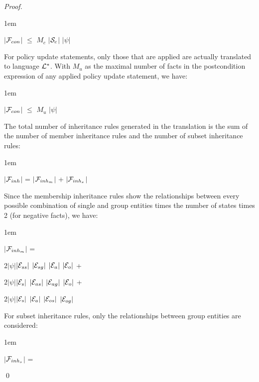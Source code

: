 \documentclass[global,twocolumn,final]{svjour}
\newenvironment{vproof}
  {\begin{proof}\hspace{0.25em}}
  {\qed\end{proof}}
\newenvironment{vquote}
  {\begin{list}{}{\leftmargin 1em}\item[]}
  {\end{list}}
\begin{document}
\begin{vproof}
          \begin{vquote}
            $|$${\cal F}_{con}$$|$ $\leq$ $M_{c}$ $|$${\cal S}_{c}$$|$ $|\psi|$
          \end{vquote}

          For policy update statements, only those that are applied are
          actually translated to language ${\cal L}^{*}$. With $M_{u}$ as the
          maximal number of facts in the postcondition expression of any
          applied policy update statement, we have:

          \begin{vquote}
            $|$${\cal F}_{con}$$|$ $\leq$ $M_{u}$ $|\psi|$
          \end{vquote}

          The total number of inheritance rules generated in the translation is
          the sum of the number of member inheritance rules and the number of
          subset inheritance rules:

          \begin{vquote}
            $|$${\cal F}_{inh}$$|$ =
            $|$${\cal F}_{inh_{m}}$$|$ +
            $|$${\cal F}_{inh_{s}}$$|$
          \end{vquote}

          Since the membership inheritance rules show the relationships between
          every possible combination of single and group entities times the
          number of states times 2 (for negative facts), we have:

          \begin{vquote}
            $|$${\cal F}_{inh_{m}}$$|$ =

            \hspace{1em}
            $2|\psi|$$|{\cal E}_{ss}|$ $|{\cal E}_{sg}|$ $|{\cal E}_{a}|$ $|{\cal E}_{o}|$ +

            \hspace{1em}
            $2|\psi|$$|{\cal E}_{s}|$ $|{\cal E}_{as}|$ $|{\cal E}_{ag}|$ $|{\cal E}_{o}|$ +

            \hspace{1em}
            $2|\psi|$$|{\cal E}_{s}|$ $|{\cal E}_{a}|$ $|{\cal E}_{os}|$ $|{\cal E}_{og}|$
          \end{vquote}

          For subset inheritance rules, only the relationships between group
          entities are considered:

          \begin{vquote}
            $|$${\cal F}_{inh_{s}}$$|$ =


\end{vquote}
\end{vproof}
\end{document}
